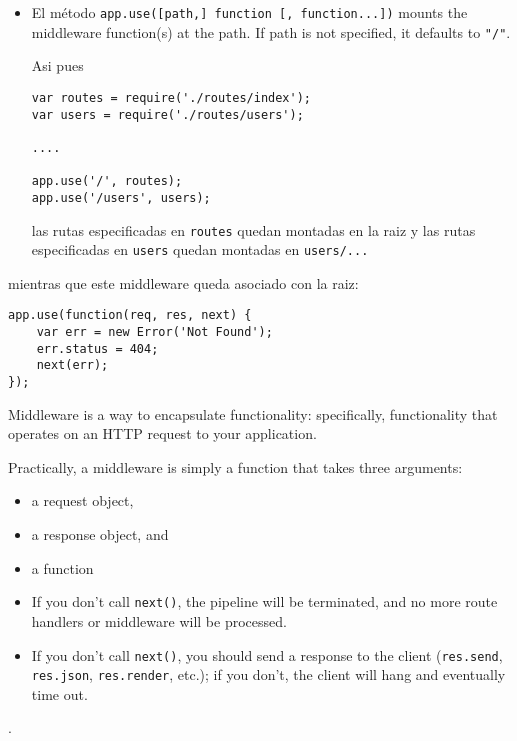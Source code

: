 \begin{itemize}
\item
El método
\verb|app.use([path,] function [, function...])|
mounts the middleware function(s) at the path. 
If path is not specified, it defaults to \verb|"/"|.

Asi pues 
\begin{verbatim}
var routes = require('./routes/index');
var users = require('./routes/users');

....

app.use('/', routes);
app.use('/users', users);
\end{verbatim}
las rutas especificadas en \verb|routes| quedan montadas en la raiz 
y las rutas especificadas en \verb|users| quedan montadas en \verb|users/...|
\end{itemize}
mientras que este middleware queda asociado con la raiz:
\begin{verbatim}
app.use(function(req, res, next) {
    var err = new Error('Not Found');
    err.status = 404;
    next(err);
});
\end{verbatim}


Middleware is a way to encapsulate functionality: 
specifically, functionality that operates on an HTTP request to your application. 

Practically, a middleware is simply a function that
takes three arguments: 
\begin{itemize}
\item
a request object, 
\item
a response object, and 
\item
a  function
\end{itemize}

\begin{itemize}
\item
If you don’t call \verb|next()|, the pipeline will be terminated, and
no more route handlers or middleware will be processed. 
\item
If you don’t
call \verb|next()|, you should send a response to the client 
(\verb|res.send|, \verb|res.json|, \verb|res.render|, etc.); 
if you don’t, the client will hang and eventually time out.
\end{itemize}


. 


